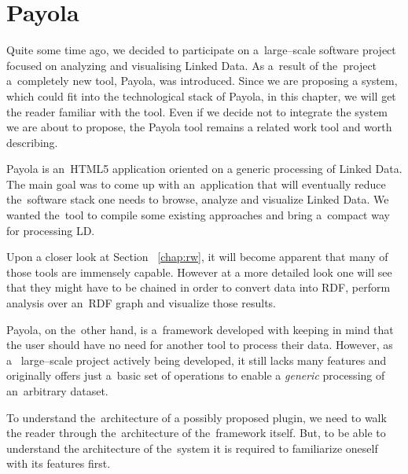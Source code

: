 \chapter{Payola}
\label{ch:payola}

Quite some time ago, we decided to participate on a~large--scale software 
project focused on analyzing and visualising Linked Data. As a~result of the~project
a~completely new tool, Payola, was introduced. Since we are proposing a 
system, which could fit into the technological stack of Payola, in this chapter, 
we will get the reader familiar with the tool. Even if we  decide 
not to integrate the system we are about to propose, the Payola tool remains
a related work tool and worth describing.

Payola is an~HTML5 application oriented on a generic processing of Linked Data. 
The main goal was to come up with an~application that will eventually reduce the~software 
stack one needs to browse, analyze and visualize Linked Data. We wanted the~tool 
to compile some existing approaches and bring a~compact way for processing LD.

Upon a closer look at Section ~\ref{chap:rw}, it will become apparent that many of those tools are
immensely capable. However at a more detailed look one will see that they might have to
be chained in order to convert data into 
RDF, perform analysis over an~RDF graph and visualize those results.

Payola, on the~other hand, is a~framework developed with keeping in mind that 
the user should have no need for another tool to process their data. However, as a~
large--scale project actively being developed, it still lacks many 
features and originally offers just a~basic set of operations to enable a
\emph{generic} processing of an~arbitrary dataset.

To understand the~architecture of a possibly proposed plugin, we need to walk the reader 
through the~architecture of the~framework itself. But, to be able to understand 
the architecture of the~system it is required to familiarize oneself with its features first.

